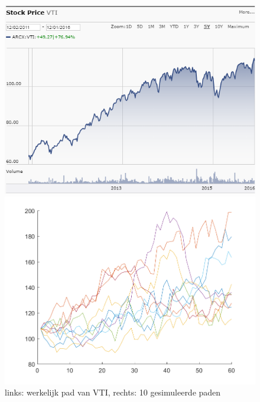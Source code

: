 \documentclass[11pt, a4paper, titlepage, openright]{article}
\begin{document}
		\begin{figure}[H]
			\begin{minipage}[b]{0.49\textwidth}
			\includegraphics[width=1.0\linewidth]{../ex4-actual}
			\end{minipage}
			\hfill
			\begin{minipage}[b]{0.49\textwidth}
			\includegraphics[width=1.0\linewidth]{../ex4-paths}
			\end{minipage}
			\caption{links: werkelijk pad van VTI, rechts: 10 gesimuleerde paden}
			\label{fig:vtiPath}
		\end{figure}
		
	\newpage
\end{document}
